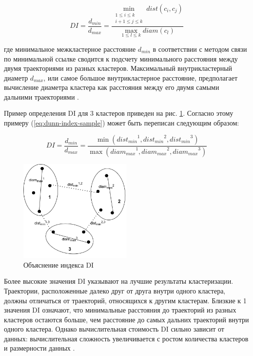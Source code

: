\begin{equation} \label{eq:dunn-index}
	DI = \frac {d_{min}} {d_{max}} = \frac{\min\limits_{\substack{1 \leq i \leq k \\ i+1 \leq j \leq k}} dist(c_i, c_j)} {\max\limits_{1 \leq l \leq k} diam(c_l)}
\end{equation}

где минимальное межкластерное расстояние $d_{min}$ в соответствии с методом связи по минимальной ссылке сводится к подсчету минимального расстояния между двумя траекториями из разных кластеров. Максимальный внутрикластерный диаметр $d_{max}$, или самое большое внутрикластерное расстояние, предполагает вычисление диаметра кластера как расстояния между его двумя самыми дальними траекториями \cite{inproceedings:clust_ind}.

Пример определения DI для 3 кластеров приведен на рис. \ref{fig:di_sample}. Согласно этому примеру (\ref{eq:dunn-index-sample}) может быть переписан следующим образом:

\begin{equation} \label{eq:dunn-index-sample}
DI = \frac {d_{min}} {d_{max}} = \frac
	{\min ({dist_{min}}^1, {dist_{min}}^2, {dist_{min}}^3)}
	{\max ({diam_{max}}^1, {diam_{max}}^2, {diam_{max}}^3)}
\end{equation}

\begin{figure}[!htb]
	\centering{}
	\includegraphics[width=0.5\textwidth]{images/di-sample.png}
	\caption{Объяснение индекса DI}
	\label{fig:di_sample}
\end{figure}

Более высокие значения DI указывают на лучшие результаты кластеризации. Траектории, расположенные далеко друг от друга внутри одного кластера, должны отличаться от траекторий, относящихся к другим кластерам. Близкие к 1 значения DI означают, что минимальные расстояния до траекторий из разных кластеров остаются больше, чем расстояние до самых дальних траекторий внутри одного кластера. Однако вычислительная стоимость DI сильно зависит от данных: вычислительная сложность увеличивается с ростом количества кластеров и размерности данных \cite{online:dunn_cl_valid}.

